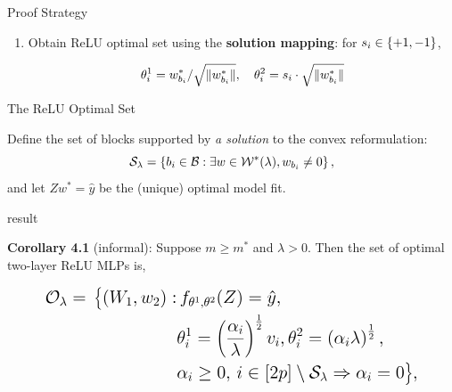 \documentclass[12pt, usenames, dvipsnames]{beamer}
\newlength{\colwidth}
\begin{document}
\begin{frame}[t]
\begin{columns}[t]
\begin{column}{\colwidth}
\begin{block}{Proof Strategy}
\begin{enumerate}
					\item Obtain ReLU optimal set using the \textbf{solution mapping}: for \( s_i \in \left\{+1, -1\right\} \),

					      { \Large
							      \begin{equation*}\label{eq:convex-to-relu}
								      \theta_{i}^1 = w_{b_i}^*/ \sqrt{\|w_{b_i}^*\|}, \quad \theta_{i}^2 = s_i \cdot \sqrt{\|w_{b_i}^*\|}
							      \end{equation*}
						      }

				\end{enumerate}

			\end{block}

			\vspace{-1em}
			\begin{block}{The ReLU Optimal Set}

				\large

				Define the set of blocks supported by \emph{a solution} to the convex reformulation:
				\[
					\mathcal{S}_\lambda = \left\{{b_i} \in \mathcal{B} : \exists w \in \mathcal{W}^*(\lambda), w_{b_i} \neq 0\right\},
				\]
				and let \( Z w^* = \hat y \) be the (unique) optimal model fit.

				\vspace{1em}

				\begin{beamercolorbox}[wd=\textwidth,sep=1em]{result}

					\textbf{Corollary 4.1} (informal):
					Suppose \( m \geq m^* \) and \( \lambda > 0 \).
					Then the set of optimal two-layer ReLU MLPs is,

					\begin{equation*}\label{eq:relu-sol-fn}
						\Large
						\begin{aligned}
							\mathcal{O}_\lambda  = \,
							\big\{
							(W_1,  w_2) : &
							\, f_{\theta^1, \theta^2}(Z)  =  \hat y,                                                        \\
							              & \theta^1_{i} = \left(\frac{\alpha_{i}}{\lambda}\right)^{\frac{1}{2}} v_i,
							\theta_{i}^2 = \left(\alpha_i \lambda\right)^{\frac{1}{2}},                                            \\
							              & \alpha_i \geq 0, \, i \in [2p] \setminus \mathcal{S}_\lambda \Rightarrow \alpha_i = 0
							\big\},
						\end{aligned}
					\end{equation*}
				\end{beamercolorbox}


\end{block}
\end{column}
\end{columns}
\end{frame}
\end{document}

